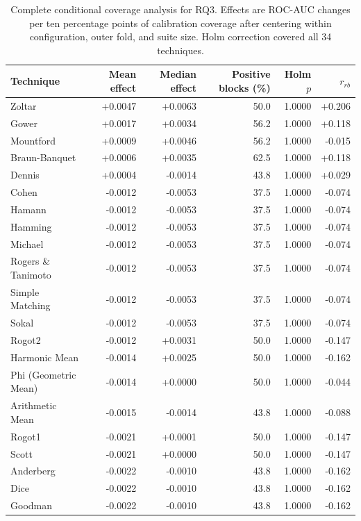 \begin{table}[t]
\centering
\caption{Complete conditional coverage analysis for RQ3. Effects are ROC-AUC changes per ten percentage points of calibration coverage after centering within configuration, outer fold, and suite size. Holm correction covered all 34 techniques.}
\label{tab:rq3v2-conditional-coverage}
{\scriptsize
\setlength{\tabcolsep}{6pt}
\begin{tabular}{lrrrrr}
\toprule
Technique & Mean effect & Median effect & Positive blocks (\%) & Holm $p$ & $r_{rb}$ \\
\midrule
Zoltar & +0.0047 & +0.0063 & 50.0 & 1.0000 & +0.206 \\
Gower & +0.0017 & +0.0034 & 56.2 & 1.0000 & +0.118 \\
Mountford & +0.0009 & +0.0046 & 56.2 & 1.0000 & -0.015 \\
Braun-Banquet & +0.0006 & +0.0035 & 62.5 & 1.0000 & +0.118 \\
Dennis & +0.0004 & -0.0014 & 43.8 & 1.0000 & +0.029 \\
Cohen & -0.0012 & -0.0053 & 37.5 & 1.0000 & -0.074 \\
Hamann & -0.0012 & -0.0053 & 37.5 & 1.0000 & -0.074 \\
Hamming & -0.0012 & -0.0053 & 37.5 & 1.0000 & -0.074 \\
Michael & -0.0012 & -0.0053 & 37.5 & 1.0000 & -0.074 \\
Rogers \& Tanimoto & -0.0012 & -0.0053 & 37.5 & 1.0000 & -0.074 \\
Simple Matching & -0.0012 & -0.0053 & 37.5 & 1.0000 & -0.074 \\
Sokal & -0.0012 & -0.0053 & 37.5 & 1.0000 & -0.074 \\
Rogot2 & -0.0012 & +0.0031 & 50.0 & 1.0000 & -0.147 \\
Harmonic Mean & -0.0014 & +0.0025 & 50.0 & 1.0000 & -0.162 \\
Phi (Geometric Mean) & -0.0014 & +0.0000 & 50.0 & 1.0000 & -0.044 \\
Arithmetic Mean & -0.0015 & -0.0014 & 43.8 & 1.0000 & -0.088 \\
Rogot1 & -0.0021 & +0.0001 & 50.0 & 1.0000 & -0.147 \\
Scott & -0.0021 & +0.0000 & 50.0 & 1.0000 & -0.147 \\
Anderberg & -0.0022 & -0.0010 & 43.8 & 1.0000 & -0.162 \\
Dice & -0.0022 & -0.0010 & 43.8 & 1.0000 & -0.162 \\
Goodman & -0.0022 & -0.0010 & 43.8 & 1.0000 & -0.162 \\

\end{tabular}}
\end{table}
